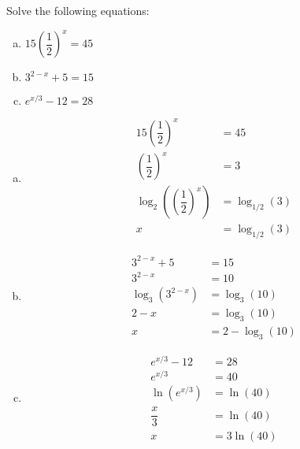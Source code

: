 \documentclass[11pt,letterpaper]{article}
\begin{document}
\newpage



 Solve the following equations:
	\begin{enumerate}[(a)]
	\item $15 \left( \dfrac{1}{2} \right)^x= 45$
	\item $3^{2 - x} + 5= 15$
	\item $e^{x/3} - 12= 28$
	\end{enumerate} \pspace

\sol
\begin{enumerate}[(a)]
\item 
	\[
	\begin{aligned}
	15 \left( \dfrac{1}{2} \right)^x&= 45 \\[0.3cm]
	\left( \dfrac{1}{2} \right)^x&= 3 \\[0.3cm]
	\log_2 \left( \left( \dfrac{1}{2} \right)^x \right)&= \log_{1/2}(3) \\[0.3cm]
	x&= \log_{1/2}(3)
	\end{aligned}
	\] \pspace

\item 
	\[
	\begin{aligned}
	3^{2 - x} + 5&= 15 \\[0.3cm]
	3^{2 - x}&= 10 \\[0.3cm]
	\log_3(3^{2 - x})&= \log_3(10) \\[0.3cm]
	2 - x&= \log_3(10) \\[0.3cm]
	x&= 2 - \log_3(10)
	\end{aligned}
	\]

\item 
	\[
	\begin{aligned}
	e^{x/3} - 12&= 28 \\[0.3cm]
	e^{x/3}&= 40 \\[0.3cm]
	\ln(e^{x/3})&= \ln(40) \\[0.3cm]
	\dfrac{x}{3}&= \ln(40) \\[0.3cm]
	x&= 3 \ln(40)
	\end{aligned}
	\]
\end{enumerate}
\end{document}
